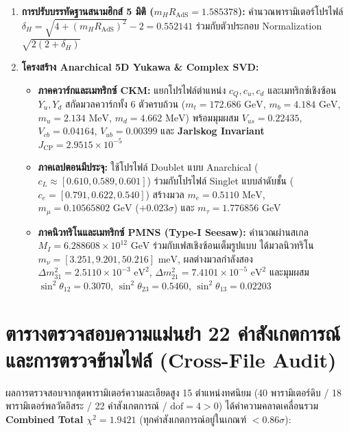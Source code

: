 \documentclass[11pt, a4paper]{article}
\begin{document}
\begin{enumerate}
    \item \textbf{การปรับบรรทัดฐานสนามฮิกส์ 5 มิติ ($m_H R_{\text{AdS}} = 1.585378$):} คำนวณพารามิเตอร์โปรไฟล์ $\delta_H = \sqrt{4 + (m_H R_{\text{AdS}})^2} - 2 = 0.552141$ ร่วมกับตัวประกอบ Normalization $\sqrt{2(2 + \delta_H)}$
    \item \textbf{โครงสร้าง Anarchical 5D Yukawa \& Complex SVD:}
    \begin{itemize}
        \item \textbf{ภาคควาร์กและเมทริกซ์ CKM:} แยกโปรไฟล์ตำแหน่ง $c_Q, c_u, c_d$ และเมทริกซ์เชิงซ้อน $Y_u, Y_d$ สกัดมวลควาร์กทั้ง 6 ตัวครบถ้วน ($m_t = 172.686\text{ GeV}$, $m_b = 4.184\text{ GeV}$, $m_u = 2.134\text{ MeV}$, $m_d = 4.662\text{ MeV}$) พร้อมมุมผสม $V_{us} = 0.22435$, $V_{cb} = 0.04164$, $V_{ub} = 0.00399$ และ \textbf{Jarlskog Invariant $J_{\text{CP}} = 2.9515 \times 10^{-5}$}
        \item \textbf{ภาคเลปตอนมีประจุ:} ใช้โปรไฟล์ Doublet แบบ Anarchical ($c_L \approx [0.610, 0.589, 0.601]$) ร่วมกับโปรไฟล์ Singlet แบบลำดับชั้น ($c_e = [0.791, 0.622, 0.540]$) สร้างมวล $m_e = 0.5110\text{ MeV}$, $m_\mu = 0.10565802\text{ GeV}$ ($+0.023\sigma$) และ $m_\tau = 1.776856\text{ GeV}$
        \item \textbf{ภาคนิวทริโนและเมทริกซ์ PMNS (Type-I Seesaw):} คำนวณผ่านสเกล $M_I = 6.288608 \times 10^{12}\text{ GeV}$ ร่วมกับเฟสเชิงซ้อนเต็มรูปแบบ ได้มวลนิวทริโน $m_\nu = [3.251, 9.201, 50.216]\text{ meV}$, ผลต่างมวลกำลังสอง $\Delta m_{31}^2 = 2.5110 \times 10^{-3}\text{ eV}^2$, $\Delta m_{21}^2 = 7.4101 \times 10^{-5}\text{ eV}^2$ และมุมผสม $\sin^2\theta_{12} = 0.3070$, $\sin^2\theta_{23} = 0.5460$, $\sin^2\theta_{13} = 0.02203$
    \end{itemize}
\end{enumerate}

\section{ตารางตรวจสอบความแม่นยำ 22 ค่าสังเกตการณ์และการตรวจข้ามไฟล์ (Cross-File Audit)}

ผลการตรวจสอบจากชุดพารามิเตอร์ความละเอียดสูง 15 ตำแหน่งทศนิยม (40 พารามิเตอร์ดิบ / 18 พารามิเตอร์พลวัตอิสระ / 22 ค่าสังเกตการณ์ / $\text{dof} = 4 > 0$) ได้ค่าความคลาดเคลื่อนรวม \textbf{Combined Total $\chi^2 = 1.9421$} (ทุกค่าสังเกตการณ์อยู่ในเกณฑ์ $< 0.86\sigma$):
\end{document}
